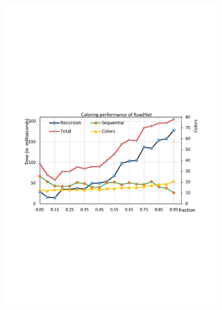 \begin{figure}[t]
{		\includegraphics[scale=0.2]{figure/exp/roadnet.pdf}
	}
	\subfloat[Wiki]{
		\label{fig:wiki}
}
\end{figure}
